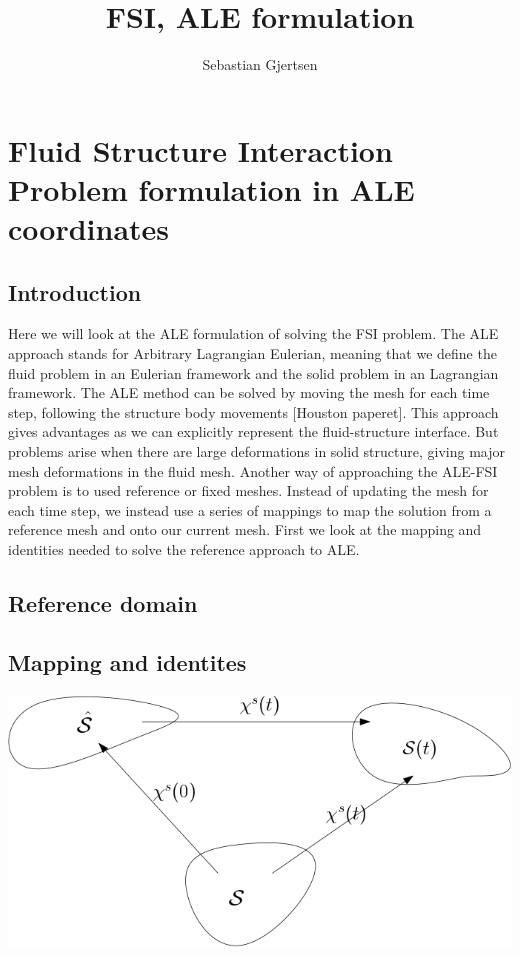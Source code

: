 
\usepackage{listings}
\usepackage{amsmath}
\title{FSI, ALE formulation}
\author{Sebastian Gjertsen}

\maketitle


\section*{Fluid Structure Interaction Problem formulation in ALE coordinates}
\subsection*{Introduction}
Here we will look at the ALE formulation of solving the FSI problem. The ALE approach stands for Arbitrary Lagrangian Eulerian, meaning that we define the fluid problem in an Eulerian framework and the solid problem in an Lagrangian framework. The ALE method can be solved by moving the mesh for each time step, following the structure body movements [Houston paperet]. This approach gives advantages as we can explicitly represent the fluid-structure interface. But problems arise when there are large deformations in solid structure, giving major mesh deformations in the fluid mesh. Another way of approaching the ALE-FSI problem is to used reference or fixed meshes. Instead of updating the mesh for each time step, we instead use a series of mappings to map the solution from a reference mesh and onto our current mesh. First we look at the mapping and identities needed to solve the reference approach to ALE.
\subsection*{Reference domain}
\subsection*{Mapping and identites}
\includegraphics[scale=0.4]{continuum_mapping.png}

